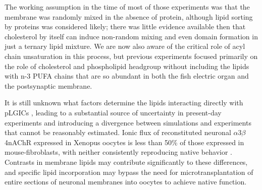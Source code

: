 
The working assumption in the time of most of those experiments was that the membrane was randomly mixed in the absence of protein, although lipid sorting by proteins was considered likely; there was little evidence available then that cholesterol by itself can induce non-random mixing and even domain formation in just a ternary lipid mixture. We are now also aware of the critical role of acyl chain unsaturation in this process, but previous experiments focused primarily on the role of cholesterol and phospholipid headgroup without including the lipids with n-3 PUFA chains that are so abundant in both the fish electric organ and the postsynaptic membrane.

It is still unknown what factors determine the lipids interacting directly with pLGICs , leading to a substantial source of uncertainty in present-day experiments and introducing a divergence between simulations and experiments that cannot be reasonably estimated. Ionic flux of reconstituted neuronal $\alpha$3$\beta$4nAChR expressed in Xenopus oocytes is less than 50\% of those expressed in mouse-fibroblasts, with neither consistently reproducing native behavior \cite{Fong_Correlation_1986,Sunshine_Lipid_1992,Hamouda_Assessing_2006,Butler_FTIR_1993,Bhushan_Correlation_1993,Fong_Stabilization_1987,Bednarczyk_Transmembrane_2002,Corrie_Lipid_2002}. Contrasts in membrane lipids may contribute significantly to these differences, and specific lipid incorporation may bypass the need for microtransplantation of entire sections of neuronal membranes \cite{Conti2013} into oocytes to achieve native function.

